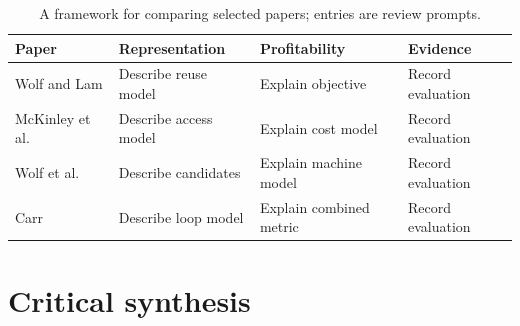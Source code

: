 \begin{table}[htbp]
  \centering
  \small
  \caption{A framework for comparing selected papers; entries are review prompts.}
  \label{tab:paper-comparison}
  \begin{tabularx}{\textwidth}{@{}p{}YYY@{}}
    \toprule
    Paper & Representation & Profitability & Evidence \\
    \midrule
    Wolf and Lam \citep{wolfLam1991locality}
      & Describe reuse model & Explain objective & Record evaluation \\
    McKinley et al.\ \citep{mckinleyCarrTseng1996}
      & Describe access model & Explain cost model & Record evaluation \\
    Wolf et al.\ \citep{wolfMaydanChen1996}
      & Describe candidates & Explain machine model & Record evaluation \\
    Carr \citep{carr1996}
      & Describe loop model & Explain combined metric & Record evaluation \\
    \bottomrule
  \end{tabularx}
\end{table}

\section{Critical synthesis}
